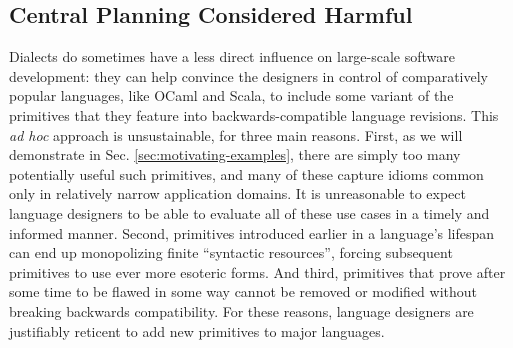 \subsection{Central Planning Considered Harmful}
Dialects do sometimes have a less direct influence on large-scale software development: they can help convince the designers in control of comparatively popular languages, like OCaml and Scala, to include some variant of the primitives that they feature into backwards-compatible language revisions. %
This \emph{ad hoc} approach is unsustainable, for three main reasons. First, as we will demonstrate in Sec. \ref{sec:motivating-examples}, there are simply too  many potentially useful such primitives, and many of these capture idioms common only in relatively narrow application domains. It is unreasonable to expect language designers to be able to evaluate all of these use cases in a timely and informed manner. Second, primitives introduced earlier in a language's lifespan can end up monopolizing finite ``syntactic resources'', forcing subsequent primitives to use ever more esoteric forms. And third, primitives that prove after some time to be flawed in some way cannot be removed or modified without breaking backwards compatibility. For these reasons, language designers are justifiably reticent to add new primitives to major languages.%

